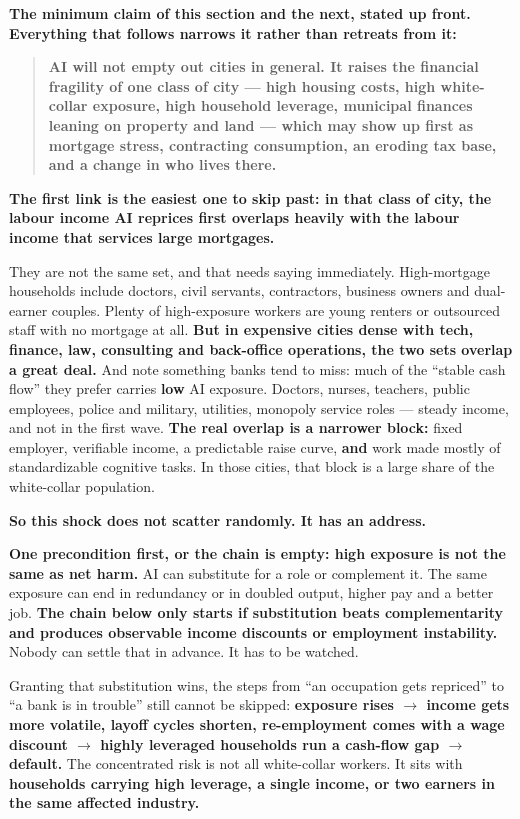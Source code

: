 \documentclass[11pt,a4paper]{article}
\begin{document}
\textbf{The minimum claim of this section and the next, stated up front. Everything that follows narrows it rather than retreats from it:}

\begin{quote}
\textbf{AI will not empty out cities in general. It raises the financial fragility of one class of city --- high housing costs, high white-collar exposure, high household leverage, municipal finances leaning on property and land --- which may show up first as mortgage stress, contracting consumption, an eroding tax base, and a change in who lives there.}
\end{quote}

\textbf{The first link is the easiest one to skip past: in that class of city, the labour income AI reprices first overlaps heavily with the labour income that services large mortgages.}

They are not the same set, and that needs saying immediately. High-mortgage households include doctors, civil servants, contractors, business owners and dual-earner couples. Plenty of high-exposure workers are young renters or outsourced staff with no mortgage at all. \textbf{But in expensive cities dense with tech, finance, law, consulting and back-office operations, the two sets overlap a great deal.} And note something banks tend to miss: much of the ``stable cash flow'' they prefer carries \textbf{low} AI exposure. Doctors, nurses, teachers, public employees, police and military, utilities, monopoly service roles --- steady income, and not in the first wave. \textbf{The real overlap is a narrower block:} fixed employer, verifiable income, a predictable raise curve, \textbf{and} work made mostly of standardizable cognitive tasks. In those cities, that block is a large share of the white-collar population.

\textbf{So this shock does not scatter randomly. It has an address.}

\textbf{One precondition first, or the chain is empty: high exposure is not the same as net harm.} AI can substitute for a role or complement it. The same exposure can end in redundancy or in doubled output, higher pay and a better job. \textbf{The chain below only starts if substitution beats complementarity and produces observable income discounts or employment instability.} Nobody can settle that in advance. It has to be watched.

Granting that substitution wins, the steps from ``an occupation gets repriced'' to ``a bank is in trouble'' still cannot be skipped: \textbf{exposure rises $\to$ income gets more volatile, layoff cycles shorten, re-employment comes with a wage discount $\to$ highly leveraged households run a cash-flow gap $\to$ default.} The concentrated risk is not all white-collar workers. It sits with \textbf{households carrying high leverage, a single income, or two earners in the same affected industry.}
\end{document}

